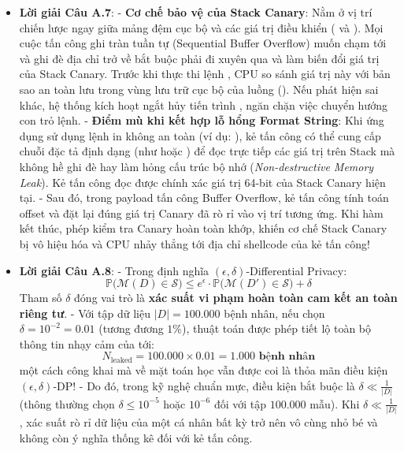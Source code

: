 \begin{itemize}
  \item \textbf{Lời giải Câu A.7}:
  - \textbf{Cơ chế bảo vệ của Stack Canary}: Nằm ở vị trí chiến lược ngay giữa mảng đệm cục bộ và các giá trị điều khiển ( và ). Mọi cuộc tấn công ghi tràn tuần tự (Sequential Buffer Overflow) muốn chạm tới và ghi đè địa chỉ trở về bắt buộc phải đi xuyên qua và làm biến đổi giá trị của Stack Canary. Trước khi thực thi lệnh , CPU so sánh giá trị này với bản sao an toàn lưu trong vùng lưu trữ cục bộ của luồng (). Nếu phát hiện sai khác, hệ thống kích hoạt ngắt hủy tiến trình , ngăn chặn việc chuyển hướng con trỏ lệnh.
  - \textbf{Điểm mù khi kết hợp lỗ hổng Format String}: Khi ứng dụng sử dụng lệnh in không an toàn (ví dụ: ), kẻ tấn công có thể cung cấp chuỗi đặc tả định dạng (như  hoặc ) để đọc trực tiếp các giá trị trên Stack mà không hề ghi đè hay làm hỏng cấu trúc bộ nhớ (\textit{Non-destructive Memory Leak}). Kẻ tấn công đọc được chính xác giá trị 64-bit của Stack Canary hiện tại.
  - Sau đó, trong payload tấn công Buffer Overflow, kẻ tấn công tính toán offset và đặt lại đúng giá trị Canary đã rò rỉ vào vị trí tương ứng. Khi hàm kết thúc, phép kiểm tra Canary hoàn toàn khớp, khiến cơ chế Stack Canary bị vô hiệu hóa và CPU nhảy thẳng tới địa chỉ shellcode của kẻ tấn công!

  \item \textbf{Lời giải Câu A.8}:
  - Trong định nghĩa $(\epsilon, \delta)$-Differential Privacy:
  \begin{equation*}
  \mathbb{P}\big(\mathcal{M}(D) \in \mathcal{S}\big) \le e^\epsilon \cdot \mathbb{P}\big(\mathcal{M}(D') \in \mathcal{S}\big) + \delta
  \end{equation*}
  Tham số $\delta$ đóng vai trò là \textbf{xác suất vi phạm hoàn toàn cam kết an toàn riêng tư}.
  - Với tập dữ liệu $|D| = 100.000$ bệnh nhân, nếu chọn $\delta = 10^{-2} = 0.01$ (tương đương $1\%$), thuật toán được phép tiết lộ toàn bộ thông tin nhạy cảm của tới:
  \begin{equation*}
  N_{\text{leaked}} = 100.000 \times 0.01 = \mathbf{1.000 \text{ bệnh nhân}}
  \end{equation*}
  một cách công khai mà về mặt toán học vẫn được coi là thỏa mãn điều kiện $(\epsilon, \delta)$-DP!
  - Do đó, trong kỹ nghệ chuẩn mực, điều kiện bắt buộc là $\delta \ll \frac{1}{|D|}$ (thông thường chọn $\delta \le 10^{-5}$ hoặc $10^{-6}$ đối với tập $100.000$ mẫu). Khi $\delta \ll \frac{1}{|D|}$, xác suất rò rỉ dữ liệu của một cá nhân bất kỳ trở nên vô cùng nhỏ bé và không còn ý nghĩa thống kê đối với kẻ tấn công.


\end{itemize}
